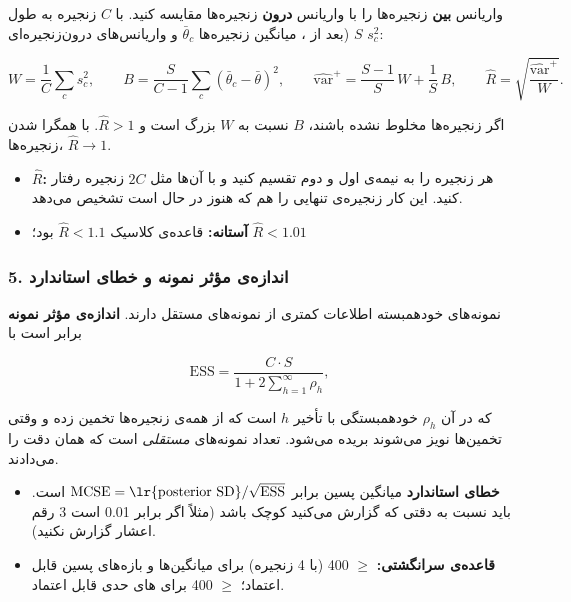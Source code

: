 واریانس \textbf{بین} زنجیره‌ها را با واریانس \textbf{درون} زنجیره‌ها
مقایسه کنید. با \(C\) زنجیره به طول \(S\) (بعد از ، میانگین
زنجیره‌ها \(\bar\theta_c\) و واریانس‌های درون‌زنجیره‌ای \(s_c^2\):

\[
W = \frac{1}{C}\sum_c s_c^2, \qquad
B = \frac{S}{C-1}\sum_c (\bar\theta_c - \bar\theta)^2, \qquad
\widehat{\mathrm{var}}^{+} = \frac{S-1}{S}\,W + \frac{1}{S}\,B, \qquad
\hat R = \sqrt{\frac{\widehat{\mathrm{var}}^{+}}{W}}.
\]

اگر زنجیره‌ها مخلوط نشده باشند، \(B\) نسبت به \(W\) بزرگ است و
\(\hat R > 1\). با همگرا شدن زنجیره‌ها، \(\hat R \to 1\).

\begin{itemize}
\tightlist
\item
  \textbf{\(\hat R\):} هر زنجیره را به نیمه‌ی اول و دوم تقسیم
  کنید و با آن‌ها مثل \(2C\) زنجیره رفتار کنید. این کار زنجیره‌ی تنهایی را
  هم که هنوز در حال  است تشخیص می‌دهد.
\item
  \textbf{آستانه:} قاعده‌ی کلاسیک \(\hat R < 1.1\) بود؛ \(\hat R < 1.01\)
\end{itemize}

\subsubsection{\texorpdfstring{5. اندازه‌ی مؤثر نمونه و خطای استاندارد
}{5. اندازه‌ی مؤثر نمونه و خطای استاندارد Monte Carlo}}

نمونه‌های خودهمبسته اطلاعات کمتری از نمونه‌های مستقل دارند.
\textbf{اندازه‌ی مؤثر نمونه} برابر است با

\[
\mathrm{ESS} = \frac{C\cdot S}{1 + 2\sum_{h=1}^{\infty}\rho_h},
\]

که در آن \(\rho_h\) خودهمبستگی با تأخیر \(h\) است که از همه‌ی زنجیره‌ها
تخمین زده و وقتی تخمین‌ها نویز می‌شوند بریده می‌شود.  تعداد
نمونه‌های \emph{مستقلی} است که همان دقت را می‌دادند.

\begin{itemize}
\tightlist
\item
  \textbf{خطای استاندارد } میانگین پسین برابر
  \(\mathrm{MCSE} = \text{\lr{posterior SD}}/\sqrt{\mathrm{ESS}}\) است. باید
  نسبت به دقتی که گزارش می‌کنید کوچک باشد (مثلاً اگر  برابر 0.01
  است 3 رقم اعشار گزارش نکنید).
\item
  \textbf{قاعده‌ی سرانگشتی:}  \ensuremath{\geq} 400 (با 4 زنجیره) برای
  میانگین‌ها و بازه‌های پسین قابل اعتماد؛  \ensuremath{\geq} 400 برای
  های حدی قابل اعتماد.
\end{itemize}

